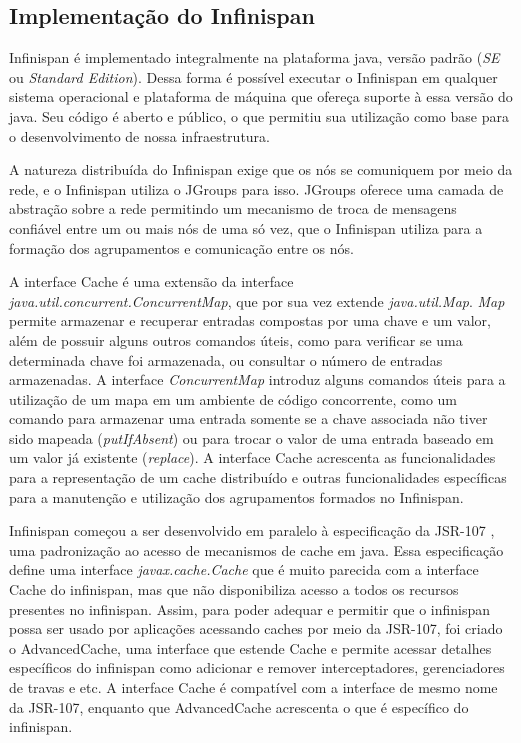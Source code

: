 \documentclass[11pt,twoside,a4paper]{book}
\begin{document}
\subsection{Implementação do Infinispan}
\label{sec:implementacao_infinispan}
Infinispan é implementado integralmente na plataforma java, versão padrão (\emph{SE} ou \emph{Standard Edition}). Dessa forma é possível executar o Infinispan em qualquer sistema operacional e plataforma de máquina que ofereça suporte à essa versão do java. Seu código é aberto e público, o que permitiu sua utilização como base para o desenvolvimento de nossa infraestrutura.

A natureza distribuída do Infinispan exige que os nós se comuniquem por meio da rede, e o Infinispan utiliza o JGroups \cite{jgroups} para isso. JGroups oferece uma camada de abstração sobre a rede permitindo um mecanismo de troca de mensagens confiável entre um ou mais nós de uma só vez, que o Infinispan utiliza para a formação dos agrupamentos e comunicação entre os nós.

A interface Cache é uma extensão da interface \emph{java.util.concurrent.ConcurrentMap}, que por sua vez extende \emph{java.util.Map}. \emph{Map} permite armazenar e recuperar entradas compostas por uma chave e um valor, além de possuir alguns outros comandos úteis, como para verificar se uma determinada chave foi armazenada, ou consultar o número de entradas armazenadas. A interface \emph{ConcurrentMap} introduz alguns comandos úteis para a utilização de um mapa em um ambiente de código concorrente, como um comando para armazenar uma entrada somente se a chave associada não tiver sido mapeada (\emph{putIfAbsent}) ou para trocar o valor de uma entrada baseado em um valor já existente (\emph{replace}). A interface Cache acrescenta as funcionalidades para a representação de um cache distribuído e outras funcionalidades específicas para a manutenção e utilização dos agrupamentos formados no Infinispan.

Infinispan começou a ser desenvolvido em paralelo à especificação da JSR-107 \cite{jsr107}, uma padronização ao acesso de mecanismos de cache em java. Essa especificação define uma interface \emph{javax.cache.Cache} que é muito parecida com a interface Cache do infinispan, mas que não disponibiliza acesso a todos os recursos presentes no infinispan. Assim, para poder adequar e permitir que o infinispan possa ser usado por aplicações acessando caches por meio da JSR-107, foi criado o AdvancedCache, uma interface que estende Cache e permite acessar detalhes específicos do infinispan como adicionar e remover interceptadores, gerenciadores de travas e etc. A interface Cache é compatível com a interface de mesmo nome da JSR-107, enquanto que AdvancedCache acrescenta o que é específico do infinispan.
\end{document}
